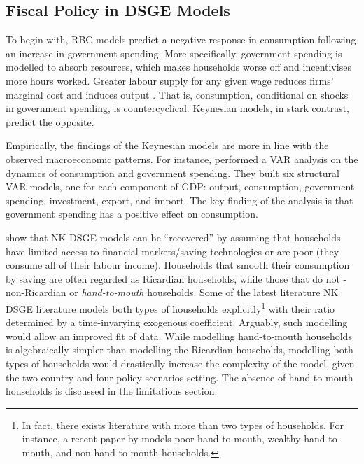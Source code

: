 \subsection{Fiscal Policy in DSGE Models}

To begin with, RBC models predict a negative response in consumption following an increase in government spending. More specifically, government spending is modelled to absorb resources, which makes households worse off and incentivises more hours worked. Greater labour supply for any given wage reduces firms' marginal cost and induces output \parencite[319]{baxter_1993_fiscal}. That is, consumption, conditional on shocks in government spending, is countercyclical. Keynesian models, in stark contrast, predict the opposite.

Empirically, the findings of the Keynesian models are more in line with the observed macroeconomic patterns. For instance, \textcite{blanchard_2002_an} performed a VAR analysis on the dynamics of consumption and government spending. They built six structural VAR models, one for each component of GDP: output, consumption, government spending, investment, export, and import. The key finding of the analysis is that government spending has a positive effect on consumption. 

\textcite{jordigal_2005_understanding} show that NK DSGE models can be ``recovered'' by assuming that households have limited access to financial markets/saving technologies or are poor (they consume all of their labour income). Households that smooth their consumption by saving are often regarded as Ricardian households, while those that do not - non-Ricardian or \textit{hand-to-mouth} households. Some of the latest literature NK DSGE literature models both types of households explicitly\footnote{In fact, there exists literature with more than two types of households. For instance, a recent paper by \textcite{eskelinen_2021_monetary} models poor hand-to-mouth, wealthy hand-to-mouth, and non-hand-to-mouth households.} with their ratio determined by a time-invarying exogenous coefficient. Arguably, such modelling would allow an improved fit of data. While modelling hand-to-mouth households is algebraically simpler than modelling the Ricardian households, modelling both types of households would drastically increase the complexity of the model, given the two-country and four policy scenarios setting. The absence of hand-to-mouth households is discussed in the limitations section.
